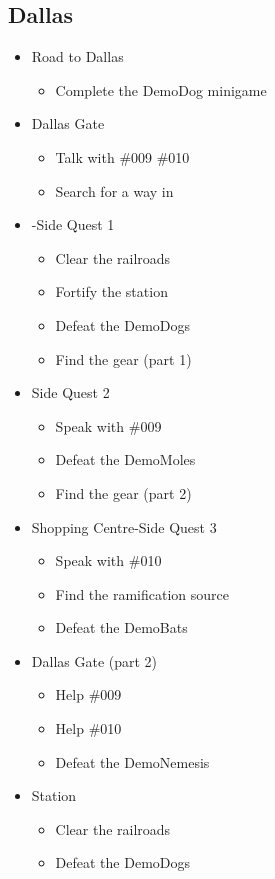 \subsection{Dallas}
\begin{itemize}
	\item Road to Dallas
	\begin{itemize}	
		\item Complete the DemoDog minigame
	\end{itemize}
	\item Dallas Gate
	\begin{itemize}
		\item Talk with \#009 \#010
		\item Search for a way in
	\end{itemize}
	\item -Side Quest 1
	\begin{itemize}
		\item Clear the railroads
		\item Fortify the station
		\item Defeat the DemoDogs
		\item Find the gear (part 1)
	\end{itemize}
	\item Side Quest 2
	\begin{itemize}
		\item Speak with \#009
		\item Defeat the DemoMoles
		\item Find the gear (part 2)
	\end{itemize}
	\item Shopping Centre-Side Quest 3
	\begin{itemize}
		\item Speak with \#010
		\item Find the ramification source
		\item Defeat the DemoBats
	\end{itemize}
	\item Dallas Gate (part 2)
	\begin{itemize}
		\item Help \#009
		\item Help \#010
		\item Defeat the DemoNemesis
	\end{itemize}
	\item Station
	\begin{itemize}
		\item Clear the railroads
		\item Defeat the DemoDogs
	\end{itemize}
\end{itemize}

